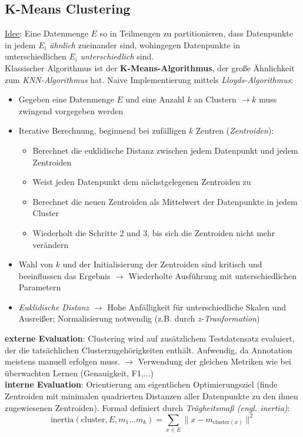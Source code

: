 \subsection{K-Means Clustering}
\label{kmeans}\underline{Idee}: Eine Datenmenge $E$ so in Teilmengen zu partitionieren, dass Datenpunkte in jedem $E_i$ \emph{ähnlich} zueinander sind, wohingegen Datenpunkte in unterschiedlichen $E_i$ \emph{unterschiedlich} sind.\\

Klassischer Algorithmus ist der \textbf{K-Means-Algorithmus}, der große Ähnlichkeit zum \emph{KNN-Algorithmus} hat. Naive Implementierung mittels \emph{Lloyds-Algorithmus}:

\begin{itemize}
    \item Gegeben eine Datenmenge $E$ und eine Anzahl $k$ an Clustern $\rightarrow k$ muss zwingend vorgegeben werden
    \item Iterative Berechnung, beginnend bei zufälligen $k$ Zentren (\emph{Zentroiden}):
    \begin{itemize}
        \item Berechnet die euklidische Distanz zwischen jedem Datenpunkt und jedem Zentroiden
        \item Weist jeden Datenpunkt dem nächstgelegenen Zentroiden zu
        \item Berechnet die neuen Zentroiden als Mittelwert der Datenpunkte in jedem Cluster
        \item Wiederholt die Schritte 2 und 3, bis sich die Zentroiden nicht mehr verändern
    \end{itemize}
    \item Wahl von $k$ und der Initialisierung der Zentroiden sind kritisch und beeinflussen das Ergebnis $\rightarrow$ Wiederholte Ausführung mit unterschiedlichen Parametern
    \item \emph{Euklidische Distanz} $\rightarrow$ Hohe Anfälligkeit für unterschiedliche Skalen und Ausreißer; Normalisierung notwendig (z.B. durch \emph{z-Tranformation})
\end{itemize}

\textbf{externe Evaluation}: Clustering wird auf zusätzlichem Testdatensatz evaluiert, der die tatsächlichen Clusterzugehörigkeiten enthält. Aufwendig, da Annotation meistens manuell erfolgen muss. $\rightarrow$ Verwendung der gleichen Metriken wie bei überwachten Lernen (Genauigkeit, F1,...)\\

\textbf{interne Evaluation}: Orientierung am eigentlichen Optimierungsziel (finde Zentroiden mit minimalen quadrierten Distanzen aller Datenpunkte zu den ihnen zugewiesenen Zentroiden). Formal definiert durch \emph{Trägheitsmaß (engl. inertia)}:\\
\begin{equation*}
    \text{inertia}(\text{cluster}, E, m_1\dots m_k)=\sum_{x\in E}\|x-m_{\text{cluster}(x)}\|^2    
\end{equation*}

